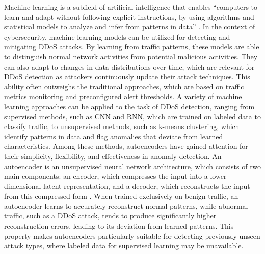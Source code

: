 Machine learning is a subfield of artificial intelligence that enables “computers to learn and adapt without following explicit instructions, by using algorithms and statistical models to analyze and infer from patterns in data” \citep{oed-machine-learning}. In the context of cybersecurity, machine learning models can be utilized for detecting and mitigating DDoS attacks. By learning from traffic patterns, these models are able to distinguish normal network activities from potential malicious activities. They can also adapt to changes in data distributions over time, which are relevant for DDoS detection as attackers continuously update their attack techniques. This ability often outweighs the traditional approaches, which are based on traffic metrics monitoring and preconfigured alert thresholds. A variety of machine learning approaches can be applied to the task of DDoS detection, ranging from supervised methods, such as CNN and RNN, which are trained on labeled data to classify traffic, to unsupervised methods, such as k-means clustering, which identify patterns in data and flag anomalies that deviate from learned characteristics. Among these methods, autoencoders have gained attention for their simplicity, flexibility, and effectiveness in anomaly detection. An autoencoder is an unsupervised neural network architecture, which consists of two main components: an encoder, which compresses the input into a lower-dimensional latent representation, and a decoder, which reconstructs the input from this compressed form \citep{michelucci2022introductionautoencoders}. When trained exclusively on benign traffic, an autoencoder learns to accurately reconstruct normal patterns, while abnormal traffic, such as a DDoS attack, tends to produce significantly higher reconstruction errors, leading to its deviation from learned patterns. This property makes autoencoders particularly suitable for detecting previously unseen attack types, where labeled data for supervised learning may be unavailable.

